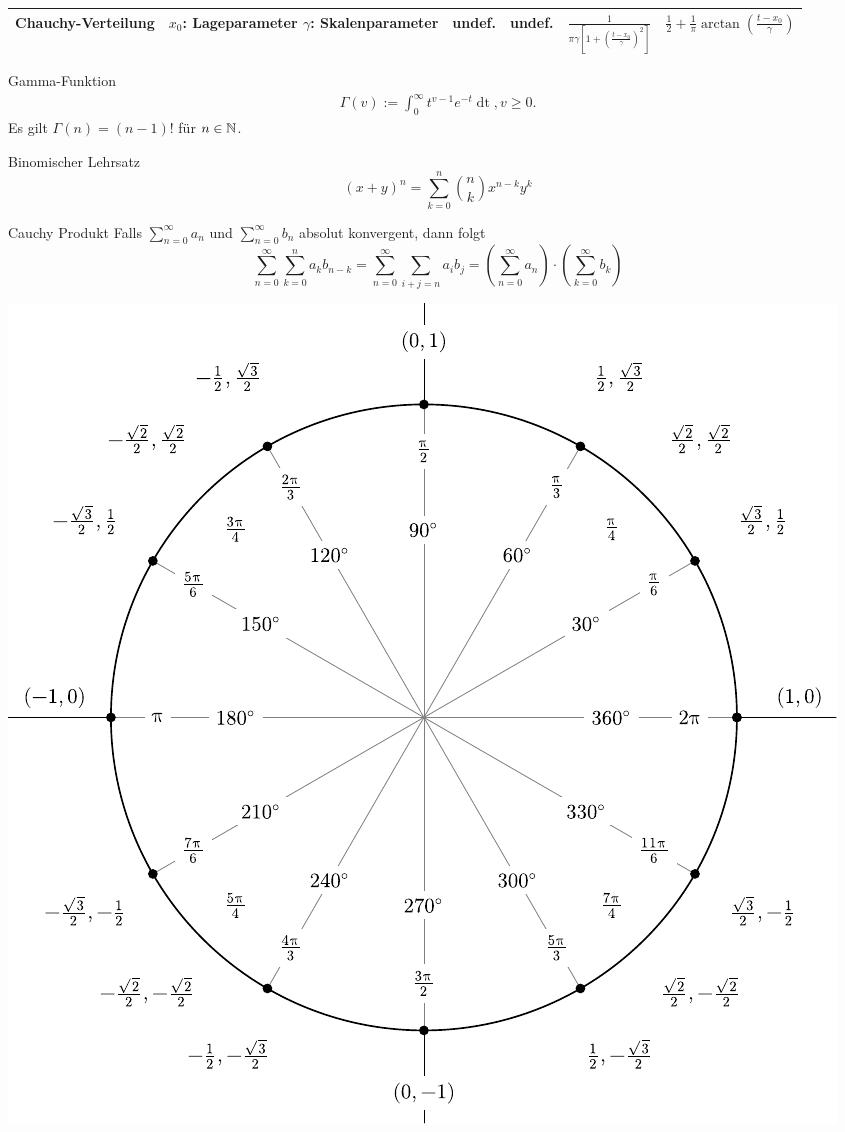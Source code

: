 {\begin{tabular}{||c|p{2cm}|*{4}{c|}|}
		Chauchy-Verteilung                                                                             & $x_0$: Lageparameter \newline $\gamma$: Skalenparameter                            & undef.                     & undef.                                                                               &
		$\frac{1}{\pi\gamma\left[1+\left(\frac{t-x_0}{\gamma}\right)^2\right]}$                        & $\frac{1}{2} + \frac{1}{\pi} \arctan\left(\frac{t-x_0}{\gamma}\right)$                                                                                                                                                       \\
		\hline
	\end{tabular}}

\renewcommand{\arraystretch}{1}

\vspace*{0.2cm}
\begin{subbox}{Gamma-Funktion}
	\begin{align*}
		\Gamma(v) := \int_0^\infty t^{v-1}e^{-t}\mathop{dt}, v \geq 0.
	\end{align*}
	Es gilt $\Gamma(n) = (n-1)!$ für $n \in \mathbb{N}$.
\end{subbox}
\begin{subbox}{Binomischer Lehrsatz}
	\[(x + y)^n = \sum_{k = 0}^n  \binom{n}{k} x^{n-k}y^k\]
\end{subbox}
\begin{subbox}{Cauchy Produkt}
	Falls $\sum_{n= 0}^\infty a_n$ und $\sum_{n = 0}^\infty b_n$ absolut konvergent, dann folgt
	\[\sum_{n = 0}^\infty \sum_{k = 0}^n a_kb_{n-k} = \sum_{n = 0}^\infty \sum_{i+j = n} a_ib_j = \left(\sum_{n = 0}^\infty a_n\right) \cdot \left(\sum_{k = 0}^\infty b_k\right)\]
\end{subbox}

\includegraphics[width=\linewidth]{degrees_circle.pdf}

